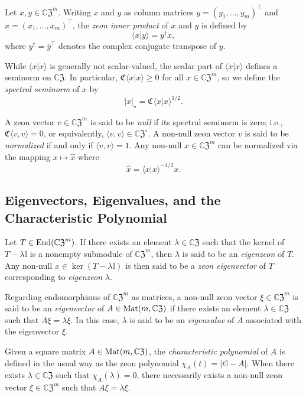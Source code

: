 \documentclass{article}
\theoremstyle{definition}
\newcommand{\zco}{\mathfrak{C}\mspace{1mu}}
\newcommand{\CZ}{\mathbb{C}\mathfrak{Z}}
\newcommand{\Mat}{{\rm Mat}}
\newcommand{\mI}{\mathbb{I}}
\numberwithin{equation}{section}
\begin{document}
Let $x,y\in{\CZ}^m$.  Writing $x$ and $y$ as column matrices $y=(y_1, \ldots, y_m)^\intercal$ and \hfill\break $x=(x_1, \ldots, x_m)^\intercal$, the {\em zeon inner product} of $x$ and $y$ is defined by
\begin{equation}\label{inner prod def}
\langle x\vert y\rangle = y^\dag x,
\end{equation}
where $y^\dag=\overline{y}^\intercal$ denotes the complex conjugate transpose of $y$.

While $\langle x\vert x\rangle$ is generally not scalar-valued, the scalar part of $\langle x\vert x\rangle$  defines a seminorm on $\CZ$.   In particular, $\zco \langle x\vert x\rangle\ge 0$ for all $x\in{\CZ}^m$, so we define the {\em spectral seminorm} of $x$ by \begin{equation}
|x|_\star=\zco\langle x\vert x\rangle^{1/2}.
\end{equation}

A zeon vector $v\in{\CZ}^m$ is said to be {\em null} if its spectral seminorm is zero; i.e., $\zco\langle v, v\rangle = 0$, or equivalently, $\langle v,v\rangle\in{\CZ}^\circ$.  A non-null zeon vector $v$ is said to be {\em normalized} if and only if $\langle v,v\rangle =1$.  Any non-null $x\in{\CZ}^m$  can be normalized via the mapping $x\mapsto \hat{x}$ where \begin{equation}
\hat{x}=\langle x\vert x\rangle^{-1/2} x.
\end{equation}

\subsection{Eigenvectors, Eigenvalues, and the Characteristic Polynomial}

Let  $T\in{\rm End}({\CZ}^m)$.   If there exists an element $\lambda\in\CZ$ such that  the kernel of $T-\lambda\mI$ is a nonempty submodule of ${\CZ}^m$, then $\lambda$ is said to be an {\em eigenzeon} of $T$.  Any non-null $x\in \ker(T-\lambda\mI)$ is then said to be a {\em zeon eigenvector} of $T$ corresponding to {\em eigenzeon} $\lambda$.

Regarding endomorphisms of ${\CZ}^m$ as matrices, a non-null zeon vector $\xi\in {\CZ}^m$ is said to be an {\em  eigenvector} of $A\in \Mat(m,\CZ)$ if there exists an element $\lambda\in{\CZ}$ such that $A\xi=\lambda \xi$.  In this case, $\lambda$ is said to be an {\em eigenvalue} of $A$ associated with the eigenvector $\xi$.

Given a square matrix $A\in \Mat(m,\CZ)$,  the {\em characteristic polynomial} of $A$ is defined in the usual way as the zeon polynomial $\chi_A(t)=|t\mI-A|$.  When there exists $\lambda\in\CZ$ such that $\chi_A(\lambda)=0$, there necessarily exists a non-null zeon vector $\xi\in{\CZ}^m$ such that $A\xi =\lambda\xi$.
\end{document}
